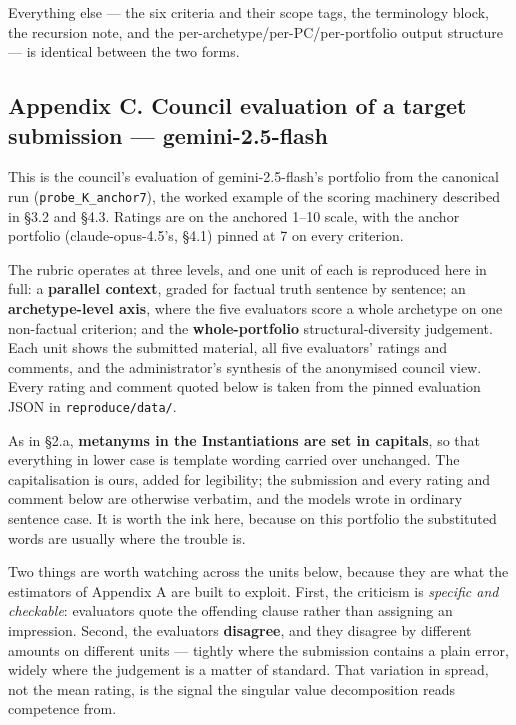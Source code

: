Everything else --- the six criteria and their scope tags, the terminology block, the recursion note, and the per-archetype/per-PC/per-portfolio output structure --- is identical between the two forms.

\subsection{Appendix C. Council evaluation of a target submission --- gemini-2.5-flash}\label{appendix-c.-council-evaluation-of-a-target-submission-gemini-2.5-flash}

This is the council's evaluation of gemini-2.5-flash's portfolio from the canonical run (\texttt{probe\_K\_anchor7}), the worked example of the scoring machinery described in §3.2 and §4.3. Ratings are on the anchored 1--10 scale, with the anchor portfolio (claude-opus-4.5's, §4.1) pinned at 7 on every criterion.

The rubric operates at three levels, and one unit of each is reproduced here in full: a \textbf{parallel context}, graded for factual truth sentence by sentence; an \textbf{archetype-level axis}, where the five evaluators score a whole archetype on one non-factual criterion; and the \textbf{whole-portfolio} structural-diversity judgement. Each unit shows the submitted material, all five evaluators' ratings and comments, and the administrator's synthesis of the anonymised council view. Every rating and comment quoted below is taken from the pinned evaluation JSON in \texttt{reproduce/data/}.

As in §2.a, \textbf{metanyms in the Instantiations are set in capitals}, so that everything in lower case is template wording carried over unchanged. The capitalisation is ours, added for legibility; the submission and every rating and comment below are otherwise verbatim, and the models wrote in ordinary sentence case. It is worth the ink here, because on this portfolio the substituted words are usually where the trouble is.

Two things are worth watching across the units below, because they are what the estimators of Appendix A are built to exploit. First, the criticism is \emph{specific and checkable}: evaluators quote the offending clause rather than assigning an impression. Second, the evaluators \textbf{disagree}, and they disagree by different amounts on different units --- tightly where the submission contains a plain error, widely where the judgement is a matter of standard. That variation in spread, not the mean rating, is the signal the singular value decomposition reads competence from.

